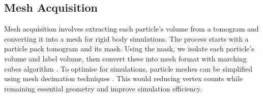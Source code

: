 \documentclass[preprint,12pt]{elsarticle}
\begin{document}
\subsection{Mesh Acquisition}
Mesh acquisition involves extracting each particle's volume from a tomogram and converting it into a mesh for rigid body simulations. 
The process starts with a particle pack tomogram and its mask. 
Using the mask, we isolate each particle's volume and label volume, then convert these into mesh format with marching cubes algorithm \citep{lorensen1987marching}.
To optimise for simulations, particle meshes can be simplified using mesh decimation techniques \citep{garland1997surface}. 
This would reducing vertex counts while remaining essential geometry and improve simulation efficiency.


\end{document}
